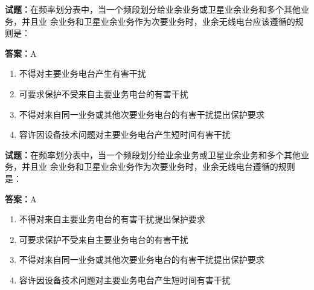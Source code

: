 \documentclass{ctexbook}
\begin{document}




\vspace{1em}

\textbf{试题：}在频率划分表中，当一个频段划分给业余业务或卫星业余业务和多个其他业务，并且业
余业务和卫星业余业务作为次要业务时，业余无线电台应该遵循的规则是： 

\textbf{答案：}A 

\begin{enumerate}[leftmargin=3em]
  \item 不得对主要业务电台产生有害干扰 

  \item 可要求保护不受来自主要业务电台的有害干扰 

  \item 不得对来自同一业务或其他次要业务电台的有害干扰提出保护要求 

  \item 容许因设备技术问题对主要业务电台产生短时间有害干扰 

\end{enumerate}





\vspace{1em}

\textbf{试题：}在频率划分表中，当一个频段划分给业余业务或卫星业余业务和多个其他业务，并且业
余业务和卫星业余业务作为次要业务时，业余无线电台遵循的规则是： 

\textbf{答案：}A 

\begin{enumerate}[leftmargin=3em]
  \item 不得对来自主要业务电台的有害干扰提出保护要求 

  \item 可要求保护不受来自主要业务电台的有害干扰 

  \item 不得对来自同一业务或其他次要业务电台的有害干扰提出保护要求 

  \item 容许因设备技术问题对主要业务电台产生短时间有害干扰 

\end{enumerate}



\end{document}
